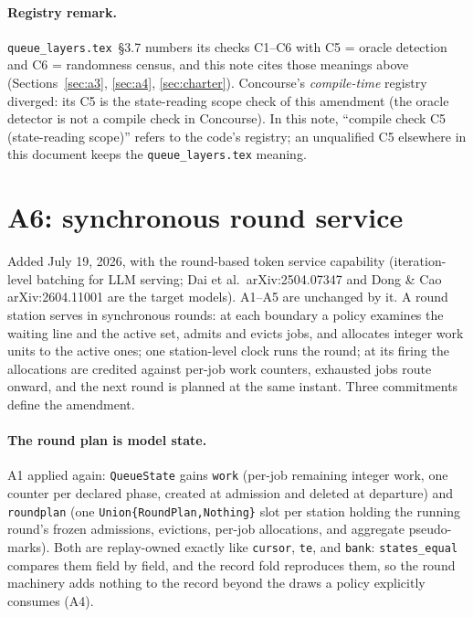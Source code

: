 \documentclass[11pt]{article}
\newcommand{\code}[1]{\texttt{#1}}
\begin{document}
\paragraph{Registry remark.} \code{queue\_layers.tex}~\S3.7 numbers its
checks C1--C6 with C5 = oracle detection and C6 = randomness census, and
this note cites those meanings above (Sections~\ref{sec:a3},
\ref{sec:a4}, \ref{sec:charter}). Concourse's \emph{compile-time} registry
diverged: its C5 is the state-reading scope check of this amendment (the
oracle detector is not a compile check in Concourse). In this note,
``compile check C5 (state-reading scope)'' refers to the code's registry;
an unqualified C5 elsewhere in this document keeps the
\code{queue\_layers.tex} meaning.

\section{A6: synchronous round service}
\label{sec:a6}

Added July 19, 2026, with the round-based token service capability
(iteration-level batching for LLM serving; Dai et al.\ arXiv:2504.07347
and Dong \& Cao arXiv:2604.11001 are the target models). A1--A5 are
unchanged by it. A round station serves in synchronous rounds: at each
boundary a policy examines the waiting line and the active set, admits and
evicts jobs, and allocates integer work units to the active ones; one
station-level clock runs the round; at its firing the allocations are
credited against per-job work counters, exhausted jobs route onward, and
the next round is planned at the same instant. Three commitments define
the amendment.

\paragraph{The round plan is model state.} A1 applied again:
\code{QueueState} gains \code{work} (per-job remaining integer work, one
counter per declared phase, created at admission and deleted at
departure) and \code{roundplan} (one \code{Union\{RoundPlan,Nothing\}}
slot per station holding the running round's frozen admissions,
evictions, per-job allocations, and aggregate pseudo-marks). Both are
replay-owned exactly like \code{cursor}, \code{te}, and \code{bank}:
\code{states\_equal} compares them field by field, and the record fold
reproduces them, so the round machinery adds nothing to the record beyond
the draws a policy explicitly consumes (A4).
\end{document}
